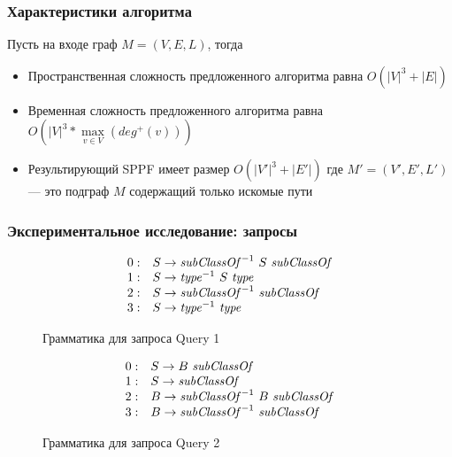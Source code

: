 \documentclass{beamer}
\begin{document}
\begin{frame}
  \transwipe[direction=90]
  \frametitle{Характеристики алгоритма}

Пусть на входе граф $M=(V,E,L)$, тогда
\begin{itemize} 
\item Пространственная сложность предложенного алгоритма равна $O(|V|^3 + |E|)$
\item Временная сложность предложенного алгоритма равна $O\left(|V|^3*\max\limits_{v \in V}\left(deg^+\left(v\right)\right)\right)$
\item Результирующий SPPF имеет размер $O(|V'|^3 + |E'|)$ где $M'=(V',E',L')$ --- это подграф $M$ содержащий только искомые пути
\end{itemize}

\end{frame}

\begin{frame}[fragile]
\transwipe[direction=90]
\frametitle{Экспериментальное исследование: запросы}
\begin{figure}[ht]
   \centering

   \[
\begin{array}{rl}
   0: & S \rightarrow \text{\textit{subClassOf}}^{-1} \ S \ \text{\textit{subClassOf}} \\ 
   1: & S \rightarrow \text{\textit{type}}^{-1} \ S \ \text{\textit{type}} \\ 
   2: & S \rightarrow \text{\textit{subClassOf}}^{-1} \ \text{\textit{subClassOf}} \\ 
   3: & S \rightarrow \text{\textit{type}}^{-1} \ \text{\textit{type}} \\ 
\end{array}
\]
   \caption{Грамматика для запроса Query 1}
   \label{grammarQ1}
   \end{figure}
\begin{figure}[h]%
   \centering

   \[
\begin{array}{rl}
   0: & S \rightarrow B \ \text{\textit{subClassOf}} \\ 
   1: & S \rightarrow \text{\textit{subClassOf}} \\ 
   2: & B \rightarrow \text{\textit{subClassOf}}^{-1} \ B \ \text{\textit{subClassOf}} \\
   3: & B \rightarrow \text{\textit{subClassOf}}^{-1} \ \text{\textit{subClassOf}} \\ 
\end{array}
\]
   \caption{Грамматика для запроса Query 2}
   \label{grammarQ2}        
   \end{figure}

\end{frame}
\end{document}
